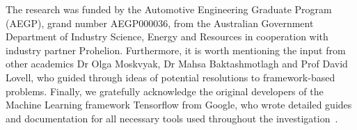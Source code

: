 The research was funded by the Automotive Engineering Graduate Program (AEGP), grand number AEGP000036, from the Australian Government Department of Industry Science, Energy and Resources in cooperation with industry partner Prohelion.
Furthermore, it is worth mentioning the input from other academics Dr Olga Moskvyak, Dr Mahsa Baktashmotlagh and Prof David Lovell, who guided through ideas of potential resolutions to framework-based problems.
Finally, we gratefully acknowledge the original developers of the Machine Learning framework Tensorflow from Google, who wrote detailed guides and documentation for all necessary tools used throughout the investigation~\cite{tensorflow2015-whitepaper}.
